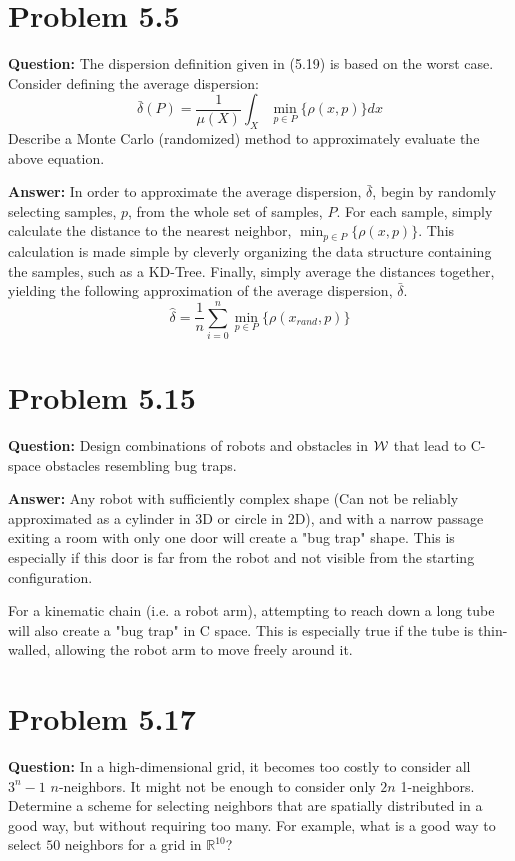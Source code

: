 \documentclass[10pt,letterpaper]{article}
\begin{document}
\section{Problem 5.5}
\textbf{Question: } The dispersion definition given in (5.19) is based on the worst case. Consider defining the average dispersion:
\begin{equation}
\bar{\delta}(P) = \frac{1}{\mu(X)} \int_X \min_{p \in P} \{ \rho(x,p) \} dx 
\end{equation}
Describe a Monte Carlo (randomized) method to approximately evaluate the above equation.

\textbf{Answer: } In order to approximate the average dispersion, $\bar{\delta}$, begin by randomly selecting samples, $p$, from the whole set of samples, $P$. For each sample, simply calculate the distance to the nearest neighbor, $\min_{p \in P} \{ \rho(x,p) \}$. This calculation is made simple by cleverly organizing the data structure containing the samples, such as a KD-Tree. Finally, simply average the distances together, yielding the following approximation of the average dispersion, $\bar{\delta}$. 
\begin{equation}
\hat{\delta} = \frac{1}{n}\sum^{n}_{i=0} \min_{p \in P} \{ \rho(x_{rand},p) \}
\end{equation}


\section{Problem 5.15}
\textbf{Question: } Design combinations of robots and obstacles in $ {\cal W}$ that lead to C-space obstacles resembling bug traps.

\textbf{Answer: } Any robot with sufficiently complex shape (Can not be reliably approximated as a cylinder in 3D or circle in 2D), and with a narrow passage exiting a room with only one door will create a "bug trap" shape. This is especially if this door is far from the robot and not visible from the starting configuration. 

For a kinematic chain (i.e. a robot arm), attempting to reach down a long tube will also create a "bug trap" in C space. This is especially true if the tube is thin-walled, allowing the robot arm to move freely around it. 




\section{Problem 5.17}
\textbf{Question: } In a high-dimensional grid, it becomes too costly to consider all $ 3^n-1$ $ n$-neighbors. It might not be enough to consider only $ 2n$ 1-neighbors. Determine a scheme for selecting neighbors that are spatially distributed in a good way, but without requiring too many. For example, what is a good way to select $ 50$ neighbors for a grid in  $ {\mathbb{R}}^{10}$?
\end{document}

